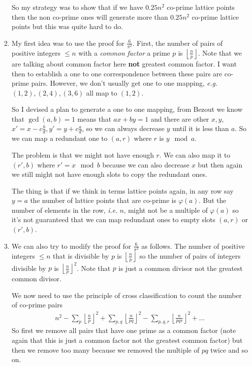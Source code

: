 \documentclass[aps,preprint,preprintnumbers,nofootinbib,showpacs,prd]{revtex4-1}
\newcommand{\ie}{{\it i.e.} }
\newcommand{\eg}{{\it e.g.} }
\newcommand{\nbea}{\begin{eqnarray*}}
\newcommand{\neea}{\end{eqnarray*}}
\begin{document}
\begin{enumerate}
So my strategy was to show that if we have $0.25 n^2$ co-prime lattice points then the non co-prime ones will generate more than $0.25 n^2$ co-prime lattice points but this was quite hard to do.

%
\item My first idea was to use the proof for $\frac{6}{\pi^2}$. First, the number of pairs of positive integers $\le n$ with a {\it common factor} a prime $p$ is $\left \lfloor \frac{n}{p} \right \rfloor$. Note that we are talking about common factor here {\bf not} greatest common factor. I want then to establish a one to one correspondence between these pairs are co-prime pairs. However, we don't usually get one to one mapping, \eg $(1,2), (2,4), (3,6)$ all map to $(1,2)$. 

So I devised a plan to generate a one to one mapping, from Bezout we know that $\gcd(a,b) = 1$ means that $ax + by = 1$ and there are other $x,y$, $x' = x - c \frac{b}{d}, y' = y + c\frac{a}{d}$, so we can always decrease $y$ until it is less than $a$. So we can map a redundant one to $(a,r)$ where $r$ is $y \mod a$.

The problem is that we might not have enough $r$. We can also map it to $(r', b)$ where $r' = x \mod b$ because we can also decrease $x$ but then again we still might not have enough slots to copy the redundant ones.

The thing is that if we think in terms lattice points again, in any row say $y=a$ the number of lattice points that are co-prime is $\varphi(a)$. But the number of elements in the row, \ie $n$, might not be a multiple of $\varphi(a)$ so it's not guaranteed that we can map redundant ones to empty slots $(a,r)$ or $(r', b)$.
%
\item We can also try to modify the proof for $\frac{6}{\pi^2}$ as follows. The number of positive integers $\le n$ that is divisible by $p$ is $\left \lfloor \frac{n}{p}\right \rfloor$ so the number of pairs of integers divisible by $p$ is  $\left \lfloor \frac{n}{p}\right \rfloor^2$. Note that $p$ is just a common divisor not the greatest common divisor.

We now need to use the principle of cross classification to count the number of co-prime pairs 
%
\nbea
n^2 - \sum_p \left \lfloor \frac{n}{p}\right \rfloor^2 + \sum_{p,q} \left \lfloor \frac{n}{pq}\right \rfloor^2 - \sum_{p,q,r} \left \lfloor \frac{n}{pqr}\right \rfloor^2 + \dots
\neea
%
So first we remove all pairs that have one prime as a common factor (note again that this is just a common factor not the greatest common factor) but then we remove too many because we removed the multiple of $pq$ twice and so on.


\end{enumerate}
\end{document}

